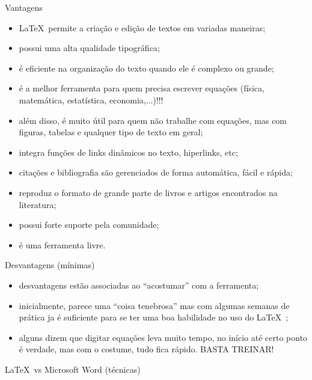 \documentclass[c]{beamer}
\begin{document}
{\begin{frame}{\sc Vantagens}
	\begin{itemize}
		\setlength\itemsep{0.2cm}
		\item \LaTeX\ permite a {\color{blue} criação} e {\color{blue} edição} de textos em variadas maneiras;
		\item possui uma alta {\color{blue} qualidade tipográfica};
		\item é eficiente na {\color{blue} organização do texto} quando ele é complexo ou grande;
		\item é a melhor ferramenta para quem precisa {\color{blue} escrever equações} (física, matemática, estatística, economia,...)!!!
		\item além disso, é muito útil para quem não trabalhe com equações, mas com {\color{blue} figuras}, 
		{\color{blue} tabelas} e qualquer tipo de {\color{blue} texto em geral};
		\item integra funções de {\color{blue} links dinâmicos} no texto, hiperlinks, etc;
		\item {\color{blue} citações} e {\color{blue} bibliografia} são gerenciados de forma automática, fácil e rápida;	
		\item reproduz o formato de grande parte de livros e artigos encontrados na literatura;
		\item possui forte {\color{blue} suporte pela comunidade};
		\item é uma {\color{blue} ferramenta livre}.
	\end{itemize}
\end{frame}
%
\begin{frame}{\sc Desvantagens (mínimas)}
	\begin{itemize}
	\setlength\itemsep{0.5cm}
	\item desvantagens estão associadas ao ``acostumar'' com a ferramenta;
	\item inicialmente, parece uma ``coisa tenebrosa'' mas com 
	algumas semanas de prática ja é suficiente para se ter uma boa habilidade no 
	uso do \LaTeX \ ;
	\item alguns dizem que digitar equações leva muito tempo, no início até certo ponto é verdade, mas 
	com o costume, tudo fica rápido. BASTA TREINAR!
	\end{itemize}
\end{frame}

\begin{frame}{\sc \LaTeX \ vs Microsoft Word (técnicas)}


\end{frame}}
\end{document}
